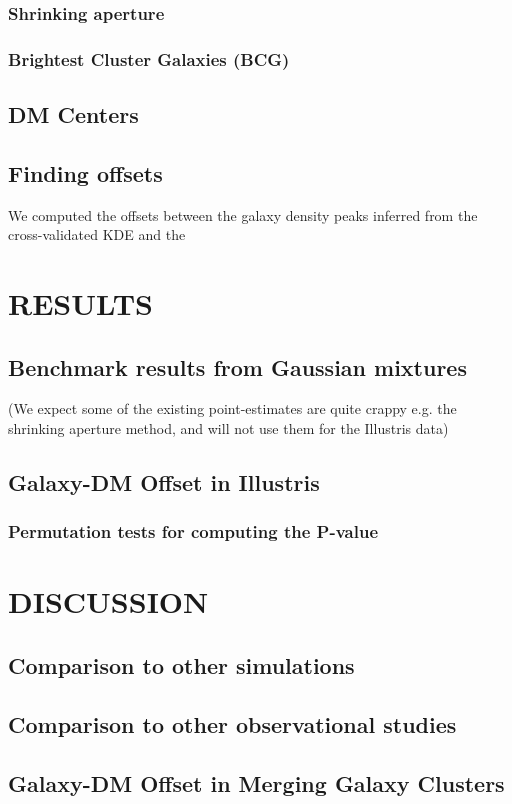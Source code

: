 \documentclass[letterpaper,useAMS,usenatbib]{mn2e}
\begin{document}
\subsubsection{Shrinking aperture}
\subsubsection{Brightest Cluster Galaxies (BCG)}
\subsection{DM Centers}
\subsection{Finding offsets} 
We computed the offsets between the galaxy density peaks inferred from the
cross-validated KDE and the  

\section{RESULTS} 
\subsection{Benchmark results from Gaussian mixtures} 
(We expect some of the existing point-estimates are quite crappy e.g. the
shrinking aperture method, and will not
use them for the Illustris data) 

\subsection{Galaxy-DM Offset in Illustris}
\subsubsection{Permutation tests for computing the P-value}
\section{DISCUSSION}
\subsection{Comparison to other simulations}
\subsection{Comparison to other observational studies}
\subsection{Galaxy-DM Offset in Merging Galaxy Clusters}
\end{document}
